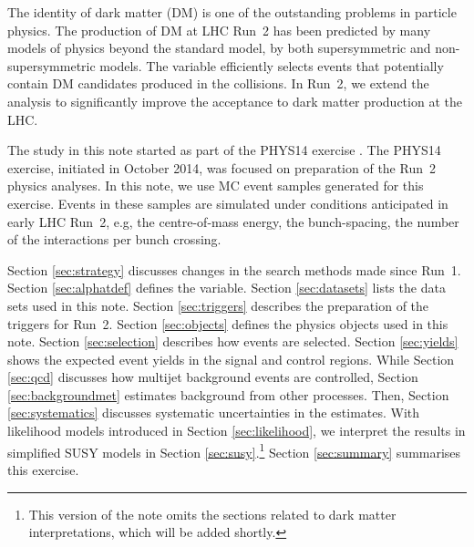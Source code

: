 The identity of dark matter (DM) is one of the outstanding problems in
particle physics. The production of DM at LHC Run~2 has been predicted
by many models of physics beyond the standard model, by both
supersymmetric and non-supersymmetric models. The \alphat variable
efficiently selects events that potentially contain DM candidates
produced in the collisions. In Run~2, we extend the \alphat analysis
to significantly improve the acceptance to dark matter production at
the LHC.

The study in this note started as part of the PHYS14 exercise
\cite{PHYS14}. The PHYS14 exercise, initiated in October 2014, was
focused on preparation of the Run~2 physics analyses. In this note, we
use MC event samples generated for this exercise. Events in these
samples are simulated under conditions anticipated in early LHC Run~2,
e.g, the centre-of-mass energy, the bunch-spacing, the number of the
interactions per bunch crossing.

Section \ref{sec:strategy} discusses changes in the search methods
made since Run~1. Section \ref{sec:alphatdef} defines the \alphat
variable.  Section \ref{sec:datasets} lists the data sets used in this
note.  Section \ref{sec:triggers} describes the preparation of the
triggers for Run~2. Section \ref{sec:objects} defines the physics
objects used in this note. Section \ref{sec:selection} describes how
events are selected. Section \ref{sec:yields} shows the expected event
yields in the signal and control regions. While Section \ref{sec:qcd}
discusses how multijet background events are controlled, Section
\ref{sec:backgroundmet} estimates background from other
processes. Then, Section \ref{sec:systematics} discusses systematic
uncertainties in the estimates. With likelihood models introduced in
Section \ref{sec:likelihood}, we interpret the results in simplified
SUSY models in Section \ref{sec:susy}.\footnote{This version of the
  note omits the sections related to dark matter interpretations,
  which will be added shortly.} Section \ref{sec:summary} summarises
this exercise.

